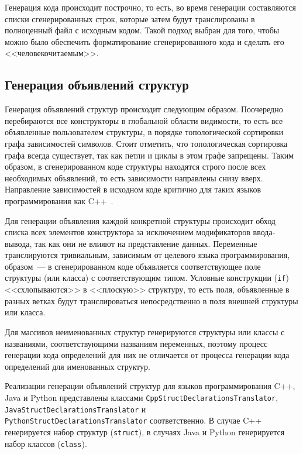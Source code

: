 \documentclass[times,specification,annotation]{style/itmo-student-thesis/itmo-student-thesis}
\begin{document}
Генерация кода происходит построчно, то есть, во время генерации составляются списки сгенерированных строк, которые затем будут транслированы в полноценный файл с исходным кодом. Такой подход выбран для того, чтобы можно было обеспечить форматирование сгенерированного кода и сделать его <<человекочитаемым>>.

\subsection{Генерация объявлений структур}

Генерация объявлений структур происходит следующим образом. Поочередно перебираются все конструкторы в глобальной области видимости, то есть все объявленные пользователем структуры, в порядке топологической сортировки графа зависимостей символов. Стоит отметить, что топологическая сортировка графа всегда существует, так как петли и циклы в этом графе запрещены. Таким образом, в сгенерированном коде структуры находятся строго после всех необходимых объявлений, то есть зависимости направлены снизу вверх. Направление зависимостей в исходном коде критично для таких языков программирования как C++~\cite{cppbook}.

Для генерации объявления каждой конкретной структуры происходит обход списка всех элементов конструктора за исключением модификаторов ввода-вывода, так как они не влияют на представление данных. Переменные транслируются тривиальным, зависимым от целевого языка программирования, образом~--- в сгенерированном коде объявляется соответствующее поле структуры (или класса) с соответствующим типом. Условные конструкции (\texttt{if}) <<схлопываются>> в <<плоскую>> структуру, то есть поля, объявленные в разных ветках будут транслироваться непосредственно в поля внешней структуры или класса.

Для массивов неименованных структур генерируются структуры или классы с названиями, соответствующими названиям переменных, поэтому процесс генерации кода определений для них не отличается от процесса генерации кода определений для именованных структур.

Реализации генерации объявлений структур для языков программирования C++, Java и Python представлены классами \texttt{CppStructDeclarationsTranslator}, \texttt{JavaStructDeclarationsTranslator} и\\\texttt{PythonStructDeclarationsTranslator} соответственно. В случае C++ генерируется набор структур (\texttt{struct}), в случаях Java и Python генерируется набор классов (\texttt{class}).
\end{document}
